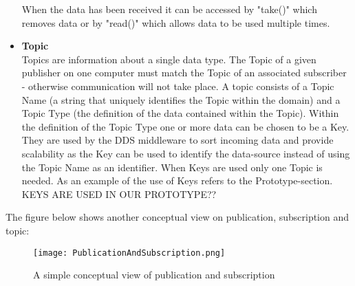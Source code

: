 \documentclass[Main]{subfiles}
\begin{document}
\begin{itemize}
\begin{itemize}
  \end{itemize}
  When the data has been received it can be accessed by "take()" which removes data or by "read()" which allows data to be used multiple times.
  \item \textbf{Topic}\\Topics are information about a single data type. The Topic of a given publisher on one computer must match the Topic of an associated subscriber - otherwise communication will not take place. A topic consists of a Topic Name (a string that uniquely identifies the Topic within the domain) and a Topic Type (the definition of the data contained within the Topic). Within the definition of the Topic Type one or more data can be chosen to be a Key. They are used by the DDS middleware to sort incoming data and provide scalability as the Key can be used to identify the data-source instead of using the Topic Name as an identifier. When Keys are used only one Topic is needed. As an example of the use of Keys refers to the Prototype-section. KEYS ARE USED IN OUR PROTOTYPE??
  \\\cite{RTI} \cite{opendds} \cite{DDS-slides}
\end{itemize}

The figure below shows another conceptual view on publication, subscription and topic: 

\begin{figure}[H]
\centering
\texttt{[image: PublicationAndSubscription.png]}
\caption{A simple conceptual view of publication and subscription \cite{ddsopen}}
\end{figure}
\end{document}
